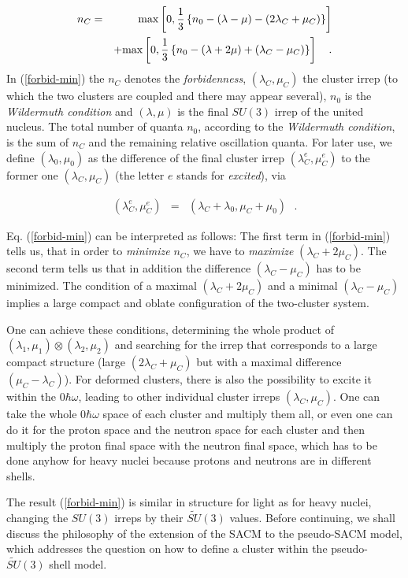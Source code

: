 \documentclass[12pt]{article}
\newcommand{\beqa}{\begin{eqnarray}}
\newcommand{\eeqa}{\end{eqnarray}}
\begin{document}
\beqa
n_{C} & = & 
{\rm max}\left[0,\frac{1}{3}\left\{ n_{0}-(\lambda -\mu
)-(2\lambda _{C}+\mu _{C})\right\} \right] 
\nonumber \\
&& +{\rm max}\left[ 0, \frac{1}{3}\left\{ n_{0}-(\lambda +2\mu )
+(\lambda _{C}-\mu_{C})\right\} \right]
~~~.
\label{forbid-min}
\eeqa
In (\ref{forbid-min}) the $n_C$ denotes the {\it forbidenness},
$(\lambda_C,\mu_C)$ the cluster irrep (to which the two clusters
are coupled and there may appear several), $n_0$ is the {\it Wildermuth condition} and
$(\lambda , \mu )$ is the final $SU(3)$ irrep of the
united nucleus. The total number of quanta $n_0$, according to the {\it Wildermuth condition},
is the sum of $n_C$ and the remaining relative oscillation quanta.
For later use, we define $\left(\lambda_0, \mu_0\right)$ as the difference of the final cluster
irrep $\left(\lambda^e_C,\mu^e_C\right)$ to the former one 
$\left(\lambda_C,\mu_C\right)$ (the letter $e$ stands for {\it excited}), via

\beqa
\left(\lambda^e_C,\mu^e_C\right) & = & \left(\lambda_C + \lambda_0,\mu_C+\mu_0\right)
~~~. 
\label{la0mu0}
\eeqa

Eq. (\ref{forbid-min}) 
can be interpreted as follows: 
The first term in (\ref{forbid-min}) tells us, that 
in order to {\it minimize} $n_C$, we
have to {\it maximize} $(\lambda_C+2\mu_C)$.
The second term tells us that in addition the difference
$\left(\lambda_C - \mu_C\right)$ has to be minimized. The condition of a maximal 
$(\lambda_C+2\mu_C)$ and a minimal $\left(\lambda_C - \mu_C\right)$
implies a large compact and oblate 
configuration of the two-cluster system.

One can achieve these conditions, 
determining the whole product
of $(\lambda_1,\mu_1) \otimes (\lambda_2,\mu_2)$ 
and searching for the irrep that corresponds to a large
compact structure (large $\left(2\lambda_C+\mu_C\right)$ but with a maximal 
difference $\left(\mu_C-\lambda_C\right)$).
For deformed clusters, there is also 
the possibility to excite it within the $0\hbar \omega$, leading to other 
individual cluster irreps $(\lambda_C,\mu_C)$. 
One can take the whole 0$\hbar\omega$ space of
each cluster and multiply them all, or even one can do it for the proton space and
the neutron space for each cluster and then multiply the proton final space with
the neutron final space, which has to be done anyhow for heavy nuclei because protons
and neutrons are in different shells. 

The result (\ref{forbid-min}) is similar in structure for light as for
heavy nuclei, changing the $SU(3)$ irreps
by their $\widetilde{SU}(3)$ values.
Before continuing, we shall discuss the philosophy of
the extension of the SACM to the pseudo-SACM model, which
addresses the question on how to define a cluster 
within the pseudo-$\widetilde{SU}(3)$ shell model.
\end{document}
